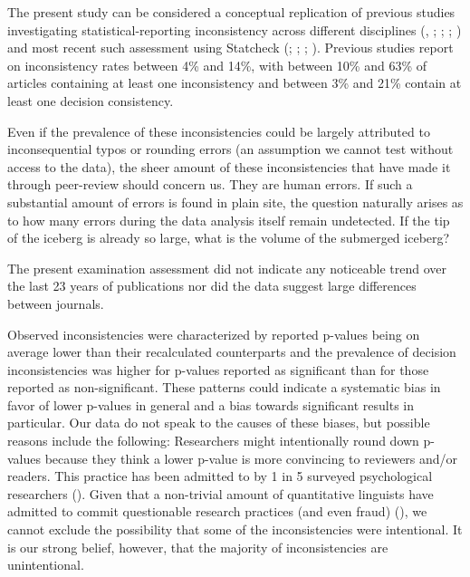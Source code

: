 \documentclass[
  doc,
  longtable,
  nolmodern,
  notxfonts,
  notimes,
  colorlinks=true,linkcolor=blue,citecolor=blue,urlcolor=blue]{apa7}
\begin{document}
The present study can be considered a conceptual replication of previous
studies investigating statistical-reporting inconsistency across
different disciplines (, ;
;
;
) and most
recent such assessment using Statcheck
(;
;
;
). Previous
studies report on inconsistency rates between 4\% and 14\%, with between
10\% and 63\% of articles containing at least one inconsistency and
between 3\% and 21\% contain at least one decision consistency.

Even if the prevalence of these inconsistencies could be largely
attributed to inconsequential typos or rounding errors (an assumption we
cannot test without access to the data), the sheer amount of these
inconsistencies that have made it through peer-review should concern us.
They are human errors. If such a substantial amount of errors is found
in plain site, the question naturally arises as to how many errors
during the data analysis itself remain undetected. If the tip of the
iceberg is already so large, what is the volume of the submerged
iceberg?

The present examination assessment did not indicate any noticeable trend
over the last 23 years of publications nor did the data suggest large
differences between journals.

Observed inconsistencies were characterized by reported p-values being
on average lower than their recalculated counterparts and the prevalence
of decision inconsistencies was higher for p-values reported as
significant than for those reported as non-significant. These patterns
could indicate a systematic bias in favor of lower p-values in general
and a bias towards significant results in particular. Our data do not
speak to the causes of these biases, but possible reasons include the
following: Researchers might intentionally round down p-values because
they think a lower p-value is more convincing to reviewers and/or
readers. This practice has been admitted to by 1 in 5 surveyed
psychological researchers (). Given that a non-trivial amount of quantitative linguists have
admitted to commit questionable research practices (and even fraud)
(), we cannot
exclude the possibility that some of the inconsistencies were
intentional. It is our strong belief, however, that the majority of
inconsistencies are unintentional.
\end{document}
